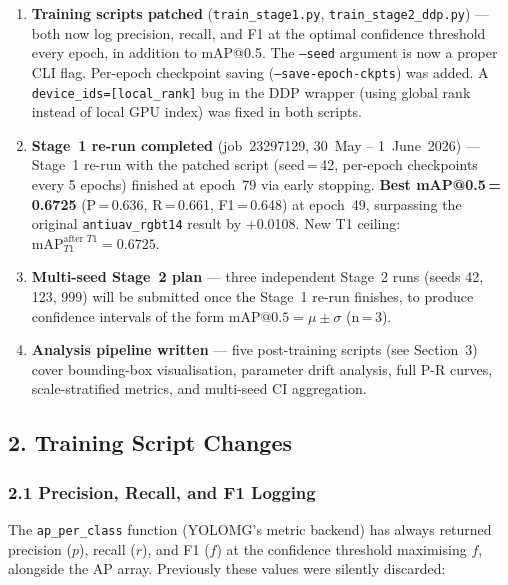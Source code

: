 \begin{enumerate}
    \item \textbf{Training scripts patched} (\texttt{train\_stage1.py},
          \texttt{train\_stage2\_ddp.py}) — both now log precision,
          recall, and F1 at the optimal confidence threshold every
          epoch, in addition to mAP@0.5. The \texttt{--seed} argument
          is now a proper CLI flag. Per-epoch checkpoint saving
          (\texttt{--save-epoch-ckpts}) was added. A \texttt{device\_ids=[local\_rank]}
          bug in the DDP wrapper (using global rank instead of local GPU
          index) was fixed in both scripts.

    \item \textbf{Stage~1 re-run completed} (job~23297129,
          30~May -- 1~June~2026) — Stage~1 re-run with the patched
          script (seed\,=\,42, per-epoch checkpoints every 5 epochs)
          finished at epoch~79 via early stopping.
          \textbf{Best mAP@0.5\,=\,0.6725} (P\,=\,0.636, R\,=\,0.661,
          F1\,=\,0.648) at epoch~49, surpassing the original
          \texttt{antiuav\_rgbt14} result by $+$0.0108.
          New T1 ceiling: $\text{mAP}_{T1}^{\text{after }T1} = 0.6725$.

    \item \textbf{Multi-seed Stage~2 plan} — three independent
          Stage~2 runs (seeds 42, 123, 999) will be submitted once
          the Stage~1 re-run finishes, to produce confidence intervals
          of the form $\text{mAP@0.5} = \mu \pm \sigma$ (n\,=\,3).

    \item \textbf{Analysis pipeline written} — five post-training
          scripts (see Section~3) cover bounding-box visualisation,
          parameter drift analysis, full P-R curves, scale-stratified
          metrics, and multi-seed CI aggregation.
\end{enumerate}

\subsection*{2. Training Script Changes}

\subsubsection*{2.1 Precision, Recall, and F1 Logging}

The \texttt{ap\_per\_class} function (YOLOMG's metric backend)
has always returned precision ($p$), recall ($r$), and F1 ($f$)
at the confidence threshold maximising $f$, alongside the AP array.
Previously these values were silently discarded:

